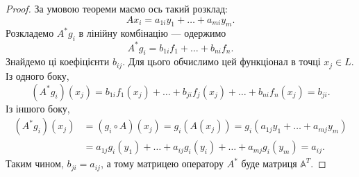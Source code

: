 \documentclass{math_library}
\begin{document}
\begin{proof}
За умовою теореми маємо ось такий розклад:
\[
A x_i = a_{1i}y_1 + \dots + a_{mi}y_m.
\]
Розкладемо $A^* g_i$ в лінійну комбінацію --- одержимо
\[
A^* g_i = b_{1i}f_1 + \dots + b_{ni}f_n.
\]
Знайдемо ці коефіцієнти $b_{ij}$. Для цього обчислимо цей функціонал в точці $x_j \in L$.\\
Із одного боку,
\[
(A^* g_i)(x_j) = b_{1i}f_1(x_j) + \dots + b_{ji}f_j(x_j) + \dots + b_{ni}f_n(x_j) = b_{ji}.
\]
Із іншого боку,
\begin{align*}
(A^* g_i)(x_j) & = (g_i \circ A)(x_j) = g_i(A(x_j)) = g_i(a_{1j}y_1 + \dots + a_{mj}y_m) \\
& = a_{1j}g_i(y_1) + \dots + a_{ij}g_i(y_i) + \dots + a_{mj}g_i(y_m) = a_{ij}.
\end{align*}
Таким чином, $b_{ji} = a_{ij}$, а тому матрицею оператору $A^*$ буде матриця $\mathbb{A}^T$.
\end{proof}

\end{document}
